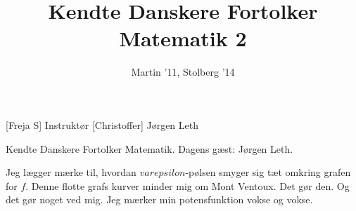 \documentclass[a4paper,11pt]{article}
\title{Kendte Danskere Fortolker Matematik 2}
\author{Martin '11, Stolberg '14}
\begin{document}
\maketitle

\begin{roles}
[Freja S] Instruktør
[Christoffer] Jørgen Leth
\end{roles}


\begin{sketch}
 Kendte Danskere Fortolker Matematik. Dagens gæst: Jørgen Leth.


 Jeg lægger mærke til, hvordan $varepsilon$-pølsen smyger sig tæt omkring grafen for $f$. Denne flotte grafs kurver minder mig om Mont Ventoux. Det gør den. Og det gør noget ved mig. Jeg mærker min potensfunktion vokse og vokse.

\end{sketch}
\end{document}
